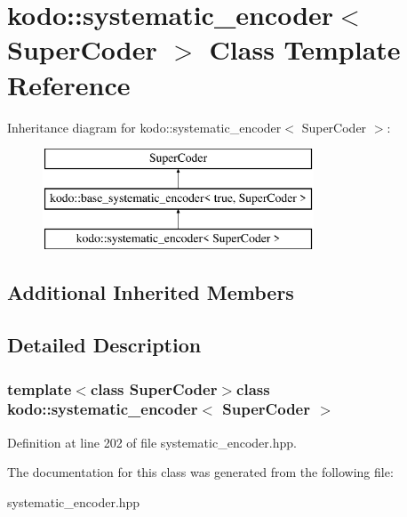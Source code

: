 \hypertarget{classkodo_1_1systematic__encoder}{\section{kodo\-:\-:systematic\-\_\-encoder$<$ Super\-Coder $>$ Class Template Reference}
\label{classkodo_1_1systematic__encoder}
}
Inheritance diagram for kodo\-:\-:systematic\-\_\-encoder$<$ Super\-Coder $>$\-:\begin{figure}[H]
\begin{center}
\leavevmode
\includegraphics[height=3.000000cm]{classkodo_1_1systematic__encoder}
\end{center}
\end{figure}
\subsection*{Additional Inherited Members}


\subsection{Detailed Description}
\subsubsection*{template$<$class Super\-Coder$>$class kodo\-::systematic\-\_\-encoder$<$ Super\-Coder $>$}



Definition at line 202 of file systematic\-\_\-encoder.\-hpp.



The documentation for this class was generated from the following file\-:\begin{DoxyCompactItemize}
\item 
systematic\-\_\-encoder.\-hpp\end{DoxyCompactItemize}
